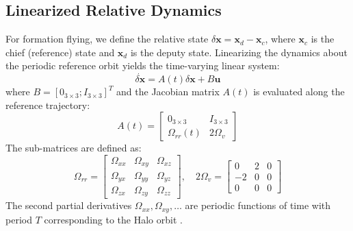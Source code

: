 \documentclass[10pt,letterpaper]{article}
\begin{document}
\subsection{Linearized Relative Dynamics}
For formation flying, we define the relative state $\delta \mathbf{x} = \mathbf{x}_d - \mathbf{x}_c$, where $\mathbf{x}_c$ is the chief (reference) state and $\mathbf{x}_d$ is the deputy state. Linearizing the dynamics about the periodic reference orbit yields the time-varying linear system:
\begin{equation}
    \dot{\delta \mathbf{x}} = A(t) \delta \mathbf{x} + B \mathbf{u} \label{eq:linearized}
\end{equation}
where $B = [0_{3 \times 3}; I_{3 \times 3}]^T$ and the Jacobian matrix $A(t)$ is evaluated along the reference trajectory:
\begin{equation}
    A(t) = \begin{bmatrix}
        0_{3 \times 3} & I_{3 \times 3} \\
        \Omega_{rr}(t) & 2\Omega_{v}
    \end{bmatrix}
\end{equation}
The sub-matrices are defined as:
\begin{equation}
    \Omega_{rr} = \begin{bmatrix}
        \Omega_{xx} & \Omega_{xy} & \Omega_{xz} \\
        \Omega_{yx} & \Omega_{yy} & \Omega_{yz} \\
        \Omega_{zx} & \Omega_{zy} & \Omega_{zz}
    \end{bmatrix}, \quad
    2\Omega_{v} = \begin{bmatrix}
        0 & 2 & 0 \\
        -2 & 0 & 0 \\
        0 & 0 & 0
    \end{bmatrix}
\end{equation}
The second partial derivatives $\Omega_{xx}, \Omega_{xy}, \dots$ are periodic functions of time with period $T$ corresponding to the Halo orbit \cite{schaub2014analytical}.
\end{document}
